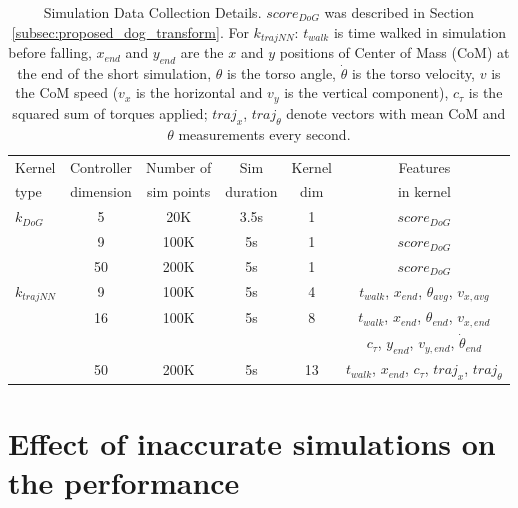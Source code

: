 \begin{table}[h!]
\centering
{}
\small{
\begin{tabular}{ lccccc } 
\toprule
Kernel & Controller & Number of & Sim & Kernel & Features \\
type & dimension & sim points & duration & dim & in kernel \\
\midrule
$k_{DoG}$ & 5 & 20K & 3.5s & 1 & $score_{DoG}$ \\ 
          & 9 & 100K & 5s & 1 & $score_{DoG}$ \\ 
     & 50 & 200K & 5s & 1 & $score_{DoG}$ \\ 
\hline
$k_{\textit{trajNN}}$ & 9 & 100K & 5s & 4 & $t_{walk}$, $x_{end}$, $\theta_{avg}$, $v_{x,avg}$\\ 
                      & 16 & 100K & 5s & 8 &
                $t_{walk}$, $x_{end}$, $\theta_{end}$, $v_{x,end}$\\
                & & & & & $c_{\tau}$,  $y_{end}$,  $v_{y,end}$, $\dot{\theta}_{end}$ \\ 
                      & 50 & 200K & 5s & 13 & $t_{walk}$, $x_{end}$, $c_{\tau}$, $\pmb{\textit{traj}}_{x}$, $\pmb{\textit{traj}}_{\theta}$ \\ 
\bottomrule
\end{tabular}
}
\caption{Simulation Data Collection Details. $score_{DoG}$ was described in Section \ref{subsec:proposed_dog_transform}. For $k_{\textit{trajNN}}$: $t_{walk}$ is time walked in simulation before falling, $x_{end}$ and $y_{end}$ are the $x$ and $y$ positions of Center of Mass (CoM) at the end of the short simulation, $\theta$ is the torso angle, $\dot{\theta}$ is the torso velocity, $v$ is the CoM speed ($v_{x}$ is the horizontal and $v_y$ is the vertical component), $c_{\tau}$ is the squared sum of torques applied; $\pmb{\textit{traj}}_{x}$, $\pmb{\textit{traj}}_{\theta}$ denote vectors with mean CoM and $\theta$ measurements every second.}
\label{tbl:kernel_details}
\end{table}




\section{Effect of inaccurate simulations on the performance}

\label{subsec:mismatch_experiments}


